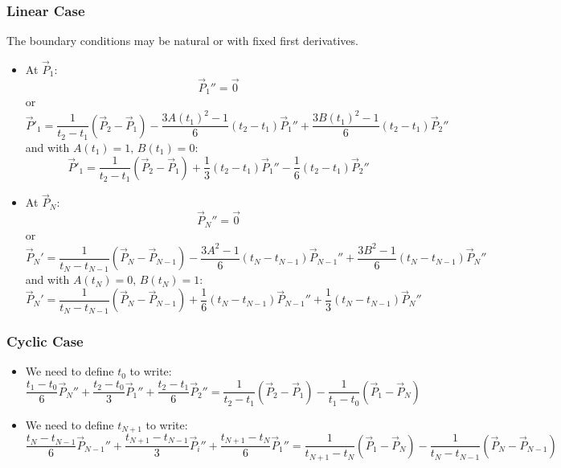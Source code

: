 \documentclass[aps,12pt]{revtex4}
\begin{document}
\subsubsection{Linear Case}
The boundary conditions may be natural or with fixed first derivatives.
\begin{itemize}
\item At $\vec{P}_1$:
\begin{equation}
	\vec{P}_1'' = \vec{0} 
\end{equation}
or
\begin{equation}
\vec{P}'_1 = \dfrac{1}{t_{2}-t_1} \left(\vec{P}_{2}-\vec{P}_1\right) 
	- \dfrac{3A(t_1)^2-1}{6} (t_{2}-t_1) \vec{P}_1''
	+ \dfrac{3B(t_1)^2-1}{6} (t_{2}-t_1) \vec{P}_{2}''
\end{equation}
and with $A(t_1)=1,\,B(t_1)=0$:
\begin{equation}
\vec{P}'_1  = \dfrac{1}{t_{2}-t_1} \left(\vec{P}_{2}-\vec{P}_1\right) 
	+ \dfrac{1}{3} (t_{2}-t_1) \vec{P}_1''
	- \dfrac{1}{6} (t_{2}-t_1) \vec{P}_{2}''
\end{equation}
 
\item At $\vec{P}_N$:
\begin{equation}
	\vec{P}_N'' = \vec{0} 
\end{equation}
or
\begin{equation}
\vec{P}_N' = \dfrac{1}{t_{N}-t_{N-1}} \left(\vec{P}_{N}-\vec{P}_{N-1}\right) 
	- \dfrac{3A^2-1}{6} (t_{N}-t_{N-1}) \vec{P}_{N-1}''
	+ \dfrac{3B^2-1}{6} (t_{N}-t_{N-1}) \vec{P}_{N}''
\end{equation}
and with $A(t_N)=0,\,B(t_N)=1$:
\begin{equation}
	\vec{P}_N' =  \dfrac{1}{t_{N}-t_{N-1}} \left(\vec{P}_{N}-\vec{P}_{N-1}\right) 
	+ \dfrac{1}{6} (t_{N}-t_{N-1}) \vec{P}_{N-1}''
	+ \dfrac{1}{3} (t_{N}-t_{N-1}) \vec{P}_{N}''
\end{equation}
\end{itemize}

\subsubsection{Cyclic Case}
\begin{itemize}
\item We need to define $t_{0}$ to write:
\begin{equation}
 	\dfrac{t_{1}-t_{0}}{6} \vec{P}_{N}'' + 
	\dfrac{t_{2}-t_{0}}{3} \vec{P}_1''
	+\dfrac{t_{2}-t_{1}}{6} \vec{P}_{2}''  = 
	\dfrac{1}{t_{2}-t_1}   \left( \vec{P}_{2} - \vec{P}_{1} \right) -
	\dfrac{1}{t_{1}-t_{0}}  \left( \vec{P}_1 - \vec{P}_{N} \right) 
\end{equation}

\item We need to define $t_{N+1}$ to write:
\begin{equation}
 	\dfrac{t_{N}-t_{N-1}}{6} \vec{P}_{N-1}'' + 
	\dfrac{t_{N+1}-t_{N-1}}{3} \vec{P}_i''
	+\dfrac{t_{N+1}-t_{N}}{6} \vec{P}_{1}''  = 
	\dfrac{1}{t_{N+1}-t_N}   \left( \vec{P}_{1} - \vec{P}_{N} \right) -
	\dfrac{1}{t_{N}-t_{N-1}} \left( \vec{P}_N - \vec{P}_{N-1} \right) 
\end{equation}

\end{itemize}
\end{document}
